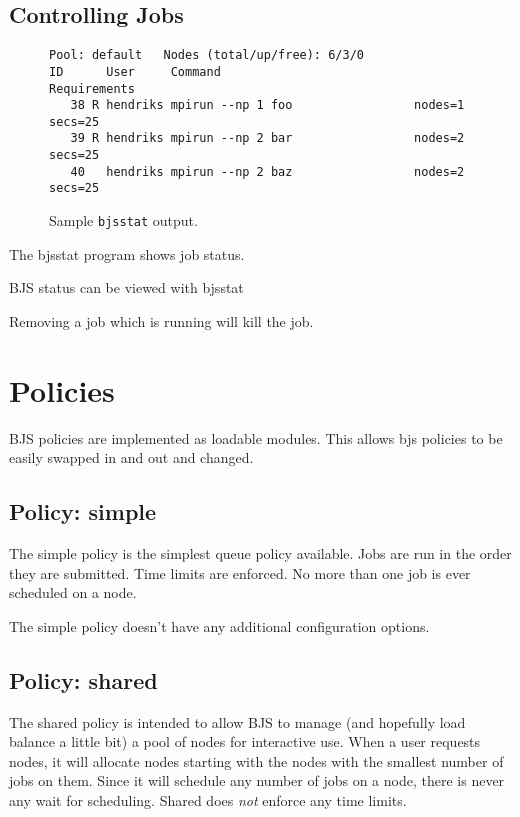 \documentclass[oneside]{book}
\begin{document}
\section{Controlling Jobs}





\begin{figure}
\begin{center}
\begin{verbatim}
Pool: default   Nodes (total/up/free): 6/3/0
ID      User     Command                        Requirements                  
   38 R hendriks mpirun --np 1 foo                 nodes=1 secs=25
   39 R hendriks mpirun --np 2 bar                 nodes=2 secs=25
   40   hendriks mpirun --np 2 baz                 nodes=2 secs=25
\end{verbatim}
\caption{Sample \texttt{bjsstat} output.}
\label{fig:bjsstat}
\end{center}
\end{figure}

The bjsstat program shows job status.  



BJS status can be viewed with bjsstat


Removing a job which is running will kill the job.


\chapter{Policies}  %

BJS policies are implemented as loadable modules.  This allows bjs
policies to be easily swapped in and out and changed.

\section{Policy: simple}
The simple policy is the simplest queue policy available.  Jobs are
run in the order they are submitted.  Time limits are enforced.  No
more than one job is ever scheduled on a node.

The simple policy doesn't have any additional configuration options.

\section{Policy: shared}

The shared policy is intended to allow BJS to manage (and hopefully
load balance a little bit) a pool of nodes for interactive use.  When
a user requests nodes, it will allocate nodes starting with the nodes
with the smallest number of jobs on them.  Since it will schedule any
number of jobs on a node, there is never any wait for scheduling.
Shared does \emph{not} enforce any time limits.
\end{document}
